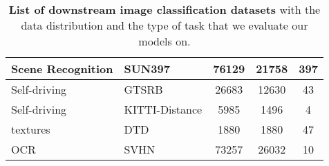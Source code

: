 \documentclass[10pt,twocolumn,letterpaper]{article}
\begin{document}
\begin{table*}[t]
\begin{tabular}{@{}l l c c c @{}}
    \midrule
    Scene Recognition & SUN397 & 76129 & 21758 & 397 \\
    
    \midrule
    Self-driving & GTSRB & 26683 & 12630 & 43 \\
    Self-driving & KITTI-Distance & 5985 & 1496 & 4 \\
    
    \midrule
    textures & DTD & 1880 & 1880 & 47 \\
    
    \midrule
    OCR & SVHN & 73257 & 26032 & 10 \\

    
    
  \bottomrule
  \end{tabular}
  \caption{\textbf{List of downstream image classification datasets} with the data distribution and the type of task that we evaluate our models on.}
  \label{tab:appendix_tasks_list}
\end{table*}
\end{document}
